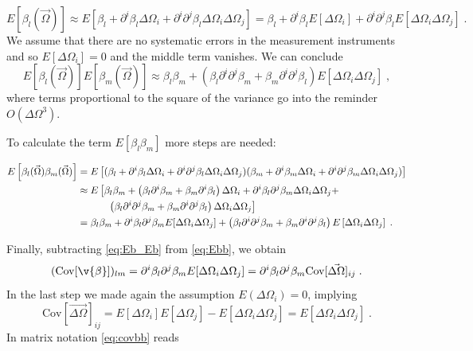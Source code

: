 \begin{equation}
E[\beta_l(\vec{\Omega})] \approx E\left[   
\beta_l + \partial^i\beta_l\Delta\Omega_i +  \partial^i\partial^j\beta_l\Delta\Omega_i\Delta\Omega_j 
\right] =
\beta_l + \partial^i\beta_l E[\Delta\Omega_i] +  \partial^i\partial^j\beta_l E\left[\Delta\Omega_i\Delta\Omega_j \right]\;.
\end{equation} We assume that there are no systematic errors in the measurement instruments and so $ {E}[{\Delta\Omega_i}] =0$ and the middle term vanishes. We can conclude
\begin{equation}
E[\beta_l(\vec{\Omega})]E[\beta_m(\vec{\Omega})] \approx \beta_l\beta_m +
 \left(\beta_l\partial^i\partial^j\beta_m +
 \beta_m\partial^i\partial^j\beta_l\right) E\left[\Delta\Omega_i\Delta\Omega_j \right]\;,
 \label{eq:Eb_Eb}
\end{equation} where terms proportional to the square of the variance go into the reminder $ O(\Delta\Omega^3) $.

To calculate the term $ {E}[{\beta_l}{\beta_m}] $ more steps are needed:

\begin{align}
E\left[\beta_l(\vec{\Omega})\beta_m(\vec{\Omega})\right]& = 
E\left[
	(
		\beta_l + \partial^i\beta_l\Delta\Omega_i + \partial^i\partial^j\beta_l\Delta\Omega_i\Delta\Omega_j
	)
	(
		\beta_m + \partial^i\beta_m\Delta\Omega_i + \partial^i\partial^j\beta_m\Delta\Omega_i\Delta\Omega_j
	)
\right] \notag \\
&\approx E\left[
	\beta_l\beta_m + 
	\left(\beta_l\partial^i\beta_m + \beta_m\partial^i\beta_l\right)\Delta\Omega_i +
	\partial^i\beta_l\partial^j\beta_m\Delta\Omega_i\Delta\Omega_j +\right. \notag\\ &\left.\quad\quad\quad
	\left(\beta_l\partial^i\partial^j\beta_m +\beta_m\partial^i\partial^j\beta_l\right)\Delta\Omega_i\Delta\Omega_j
\right] \notag\\
&= 	
	\beta_l\beta_m + 
	\partial^i\beta_l\partial^j\beta_mE[\Delta\Omega_i\Delta\Omega_j]+
	\left(\beta_l\partial^i\partial^j\beta_m +
	\beta_m\partial^i\partial^j\beta_l\right) E\left[\Delta\Omega_i\Delta\Omega_j \right]\;.
	\label{eq:Ebb}
\end{align} 

Finally, subtracting \eqref{eq:Eb_Eb} from \eqref{eq:Ebb}, we obtain
\begin{equation}
(\text{Cov}[\v{\beta}])_{lm} = \partial^i\beta_l\partial^j\beta_mE[\Delta\Omega_i\Delta\Omega_j] = \partial^i\beta_l\partial^j\beta_m \text{Cov}[\vec{\Delta\Omega}]_{ij}\;.
\label{eq:covbb}
\end{equation}
In the last step we made again the assumption $ E(\Delta\Omega_i)=0 $, implying
\begin{equation}\label{key}
\text{Cov}[\vec{\Delta\Omega}]_{ij} =  E\left[\Delta\Omega_i \right] E[\Delta\Omega_j ] -  E\left[\Delta\Omega_i\Delta\Omega_j \right] =  E\left[\Delta\Omega_i\Delta\Omega_j \right]\;.
\end{equation}
In matrix notation \eqref{eq:covbb} reads

